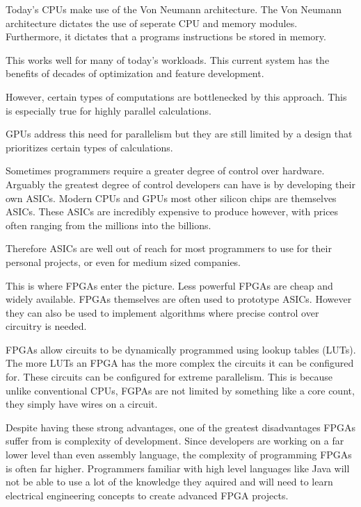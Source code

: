 \documentclass{article}
\begin{document}
    Today's CPUs make use of the Von Neumann architecture. The Von Neumann architecture dictates the use
    of seperate CPU and memory modules. Furthermore, it dictates that a programs instructions be stored
    in memory.

    This works well for many of today's workloads. This current system has the benefits of decades of optimization
    and feature development.

    However, certain types of computations are bottlenecked by this approach. This is especially true for
    highly parallel calculations.

    GPUs address this need for parallelism but they are still limited by a design that prioritizes
    certain types of calculations.

    Sometimes programmers require a greater degree of control over hardware. Arguably the greatest degree
    of control developers can have is by developing their own ASICs. Modern CPUs and GPUs most
    other silicon chips are themselves ASICs. These ASICs are incredibly expensive to produce however,
    with prices often ranging from the millions into the billions.

    Therefore ASICs are well out of reach for most programmers to use for their personal projects, or even for
    medium sized companies.

    This is where FPGAs enter the picture. Less powerful FPGAs are cheap and widely available. FPGAs themselves
    are often used to prototype ASICs. However they can also be used to implement algorithms where precise control
    over circuitry is needed.

    FPGAs allow circuits to be dynamically programmed using lookup tables (LUTs). The more LUTs an FPGA
    has the more complex the circuits it can be configured for. These circuits can be configured for
    extreme parallelism. This is because unlike conventional CPUs, FGPAs are not limited by something like a core count,
    they simply have wires on a circuit.

    Despite having these strong advantages, one of the greatest disadvantages FPGAs suffer from is complexity of development.
    Since developers are working on a far lower level than even assembly language, the complexity
    of programming FPGAs is often far higher. Programmers familiar with high level languages
    like Java will not be able to use a lot of the knowledge they aquired and will need to learn electrical engineering
    concepts to create advanced FPGA projects.
\end{document}

